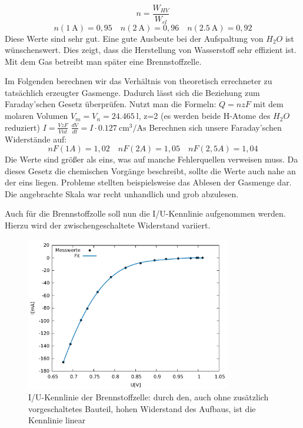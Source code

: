 \[ n=\frac{W_{HV}}{W_{el}} \]
\[
n(\SI{1}{\ampere})=0,95 \quad
n(\SI{2}{\ampere})=0,96 \quad
n(\SI{2,5}{\ampere})=0,92
\]
Diese Werte sind sehr gut. Eine gute Ausbeute bei der Aufspaltung von $H_2O$ ist wünschenswert. Dies zeigt, dass die Herstellung von Wasserstoff sehr effizient ist. Mit dem Gas betreibt man später eine Brennstoffzelle.

Im Folgenden berechnen wir das Verhältnis von theoretisch errechneter zu tatsächlich erzeugter Gasmenge. Dadurch lässt sich die Beziehung zum Faraday’schen Gesetz überprüfen. Nutzt man die Formeln:
$Q=nzF$
mit dem molaren Volumen $V_m=V_n=\SI{24,465}{\litre}$,
z=2 (es werden beide H-Atome des $H_2O$ reduziert)
$I=\frac{VzF}{Vnt}$
$\frac{dV}{dt}=I \cdot \SI{0.127}{\centi \meter \cubed \per \ampere \second}$
Berechnen sich unsere Faraday’schen Widerstände auf:
\[
nF(1A)=1,02 \quad nF(2A) = 1,05 \quad nF(2,5A)=1,04
\]
Die Werte sind größer als eins, was auf manche Fehlerquellen verweisen muss. Da dieses Gesetz die chemischen Vorgänge beschreibt, sollte die Werte auch nahe an der eins liegen. Probleme stellten beispielsweise das Ablesen der Gasmenge dar. Die angebrachte Skala war recht unhandlich und grob abzulesen.

Auch für die Brennstoffzolle soll nun die I/U-Kennlinie aufgenommen werden. Hierzu wird der zwischengeschaltete Widerstand variiert.
\begin{figure}
	\centering
	\includegraphics[width=0.8\textwidth]{mess/aufg10.pdf}
	\caption{I/U-Kennlinie der Brennstoffzelle: durch den, auch ohne zusätzlich vorgeschaltetes Bauteil, hohen Widerstand des Aufbaus, ist die Kennlinie linear}
	\label{a10}
\end{figure}

